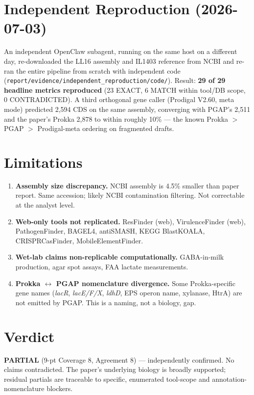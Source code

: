 \documentclass[11pt,letterpaper]{article}
\begin{document}
\section{Independent Reproduction (2026-07-03)}
An independent OpenClaw subagent, running on the same host on a
different day, re-downloaded the LL16 assembly and IL1403 reference
from NCBI and re-ran the entire pipeline from scratch with independent
code (\texttt{report/evidence/independent\_reproduction/code/}).
Result: \textbf{29 of 29 headline metrics reproduced} (23 EXACT,
6 MATCH within tool/DB scope, 0 CONTRADICTED). A third orthogonal
gene caller (Prodigal V2.60, meta mode) predicted 2{,}594 CDS on the
same assembly, converging with PGAP's 2{,}511 and the paper's Prokka
2{,}878 to within roughly 10\% --- the known Prokka $>$ PGAP $>$
Prodigal-meta ordering on fragmented drafts.

\section{Limitations}
\begin{enumerate}[leftmargin=1.4em]
\item \textbf{Assembly size discrepancy.} NCBI assembly is 4.5\%
smaller than paper report. Same accession; likely NCBI contamination
filtering. Not correctable at the analyst level.
\item \textbf{Web-only tools not replicated.} ResFinder (web),
VirulenceFinder (web), PathogenFinder, BAGEL4, antiSMASH, KEGG BlastKOALA,
CRISPRCasFinder, MobileElementFinder.
\item \textbf{Wet-lab claims non-replicable computationally.}
GABA-in-milk production, agar spot assays, FAA lactate measurements.
\item \textbf{Prokka $\leftrightarrow$ PGAP nomenclature divergence.}
Some Prokka-specific gene names (\emph{lacR}, \emph{lacE/F/X},
\emph{ldhD}, EPS operon name, xylanase, HtrA) are not emitted by PGAP.
This is a naming, not a biology, gap.
\end{enumerate}

\section{Verdict}
\textbf{PARTIAL} (9-pt Coverage 8, Agreement 8) --- independently
confirmed. No claims contradicted. The paper's underlying biology is
broadly supported; residual partials are traceable to specific,
enumerated tool-scope and annotation-nomenclature blockers.
\end{document}
